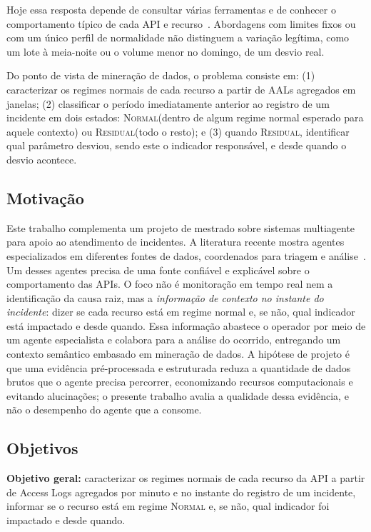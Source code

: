 \documentclass[sigconf,nonacm]{acmart}
\newcommand{\Normal}{\textsc{Normal}\xspace}
\newcommand{\Residual}{\textsc{Residual}\xspace}
\begin{document}
Hoje essa resposta depende de consultar várias ferramentas e de conhecer o comportamento típico de cada API e recurso~\citep{zhang2025isre}. Abordagens com limites fixos ou com um único perfil de normalidade não distinguem a variação legítima, como um lote à meia-noite ou o volume menor no domingo, de um desvio real.

Do ponto de vista de mineração de dados, o problema consiste em: (1) caracterizar os regimes normais de cada recurso a partir de AALs agregados em janelas; (2) classificar o período imediatamente anterior ao registro de um incidente em dois estados: \Normal (dentro de algum regime normal esperado para aquele contexto) ou \Residual (todo o resto); e (3) quando \Residual, identificar qual parâmetro desviou, sendo este o indicador responsável, e desde quando o desvio acontece.


\subsection{Motivação}
Este trabalho complementa um projeto de mestrado sobre sistemas multiagente para apoio ao atendimento de incidentes. A literatura recente mostra agentes especializados em diferentes fontes de dados, coordenados para triagem e análise~\citep{yu2025triangle,luo2025opsagent,zhang2025isre}. Um desses agentes precisa de uma fonte confiável e explicável sobre o comportamento das APIs. O foco não é monitoração em tempo real nem a identificação da causa raiz, mas a \emph{informação de contexto no instante do incidente}: dizer se cada recurso está em regime normal e, se não, qual indicador está impactado e desde quando. Essa informação abastece o operador por meio de um agente especialista e colabora para a análise do ocorrido, entregando um contexto semântico embasado em mineração de dados. A hipótese de projeto é que uma evidência pré-processada e estruturada reduza a quantidade de dados brutos que o agente precisa percorrer, economizando recursos computacionais e evitando alucinações; o presente trabalho avalia a qualidade dessa evidência, e não o desempenho do agente que a consome.

\subsection{Objetivos}
\textbf{Objetivo geral:} caracterizar os regimes normais de cada recurso da API a partir de Access Logs agregados por minuto e no instante do registro de um incidente, informar se o recurso está em regime \Normal e, se não, qual indicador foi impactado e desde quando.
\end{document}
